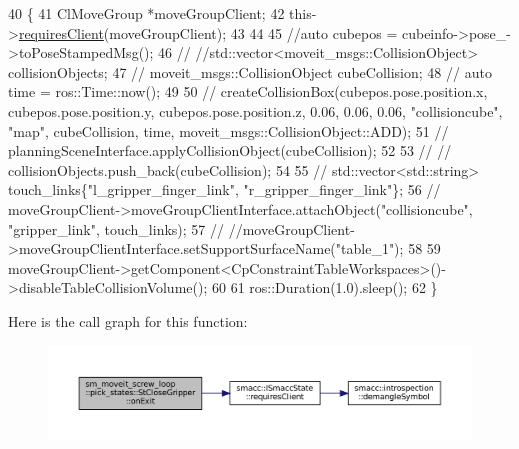 \begin{DoxyCode}
40          \{
41             ClMoveGroup *moveGroupClient;
42             this->\hyperlink{classsmacc_1_1ISmaccState_a7f95c9f0a6ea2d6f18d1aec0519de4ac}{requiresClient}(moveGroupClient);
43 
44 
45             \textcolor{comment}{//auto cubepos = cubeinfo->pose\_->toPoseStampedMsg();}
46             \textcolor{comment}{// //std::vector<moveit\_msgs::CollisionObject> collisionObjects;}
47             \textcolor{comment}{// moveit\_msgs::CollisionObject cubeCollision;}
48             \textcolor{comment}{// auto time = ros::Time::now();}
49 
50             \textcolor{comment}{// createCollisionBox(cubepos.pose.position.x, cubepos.pose.position.y,
       cubepos.pose.position.z, 0.06, 0.06, 0.06, "collisioncube", "map",  cubeCollision, time, moveit\_msgs::CollisionObject::ADD);}
51             \textcolor{comment}{// planningSceneInterface.applyCollisionObject(cubeCollision);}
52 
53             \textcolor{comment}{// // collisionObjects.push\_back(cubeCollision);}
54             
55             \textcolor{comment}{// std::vector<std::string> touch\_links\{"l\_gripper\_finger\_link", "r\_gripper\_finger\_link"\};}
56             \textcolor{comment}{// moveGroupClient->moveGroupClientInterface.attachObject("collisioncube", "gripper\_link",
       touch\_links);}
57             \textcolor{comment}{// //moveGroupClient->moveGroupClientInterface.setSupportSurfaceName("table\_1");}
58             
59             moveGroupClient->getComponent<CpConstraintTableWorkspaces>()->disableTableCollisionVolume();
60 
61             ros::Duration(1.0).sleep();
62          \}
\end{DoxyCode}
Here is the call graph for this function\+:
\nopagebreak
\begin{figure}[H]
\begin{center}
\leavevmode
\includegraphics[width=350pt]{structsm__moveit__screw__loop_1_1pick__states_1_1StCloseGripper_a0735d1d56c1249270fdee6fd3ae2a222_cgraph}
\end{center}
\end{figure}
\mbox{\label{structsm__moveit__screw__loop_1_1pick__states_1_1StCloseGripper_a448951288b11f6cebe1ac4efd74e9762}} 
